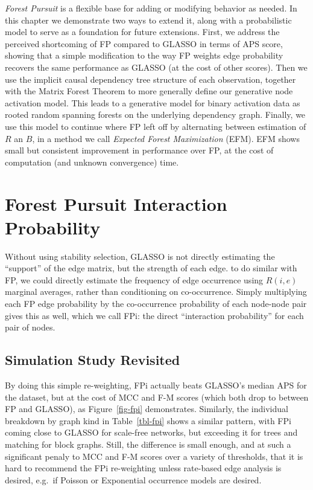 \documentclass[%
	12pt,
		oneside,
		letterpaper
]{book}
\begin{document}
\emph{Forest Pursuit} is a flexible base for adding or modifying behavior as needed.
In this chapter we demonstrate two ways to extend it, along with a probabilistic model to serve as a foundation for future extensions.
First, we address the perceived shortcoming of FP compared to GLASSO in terms of APS score, showing that a simple modification to the way FP weights edge probability recovers the same performance as GLASSO (at the cost of other scores).
Then we use the implicit causal dependency tree structure of each observation, together with the Matrix Forest Theorem \autocite{MatrixForestTheorem_Chebotarev2006,Countingrootedforests_Knill2013} to more generally define our generative node activation model.
This leads to a generative model for binary activation data as rooted random spanning forests on the underlying dependency graph.
Finally, we use this model to continue where FP left off by alternating between estimation of \(R\) an \(B\), in a method we call \emph{Expected Forest Maximization} (EFM).
EFM shows small but consistent improvement in performance over FP, at the cost of computation (and unknown convergence) time.

\section{Forest Pursuit Interaction Probability}\label{sec-fpi}

Without using stability selection\autocite{StabilitySelection_Meinshausen2010}, GLASSO is not directly estimating the ``support'' of the edge matrix, but the strength of each edge.
to do similar with FP, we could directly estimate the frequency of edge occurrence using \(R(i,e)\) marginal averages, rather than conditioning on co-occurrence.
Simply multiplying each FP edge probability by the co-occurrence probability of each node-node pair gives this as well, which we call FPi: the direct ``interaction probability'' for each pair of nodes.

\subsection{Simulation Study Revisited}\label{simulation-study-revisited}

By doing this simple re-weighting, FPi actually beats GLASSO's median APS for the dataset, but at the cost of MCC and F-M scores (which both drop to between FP and GLASSO), as Figure~\ref{fig-fpi} demonstrates.
Similarly, the individual breakdown by graph kind in Table~\ref{tbl-fpi} shows a similar pattern, with FPi coming close to GLASSO for scale-free networks, but exceeding it for trees and matching for block graphs.
Still, the difference is small enough, and at such a significant penaly to MCC and F-M scores over a variety of thresholds, that it is hard to recommend the FPi re-weighting unless rate-based edge analysis is desired, e.g.~if Poisson or Exponential occurrence models are desired.
\end{document}
